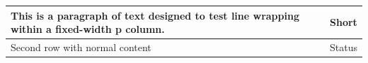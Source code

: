 \documentclass{article}
\begin{document}
\begin{tabular}{|p{5cm}|l|}
\hline
This is a paragraph of text designed to test line wrapping within a fixed-width p column. & Short \\
\hline
Second row with normal content & Status \\
\hline
\end{tabular}
\end{document}
